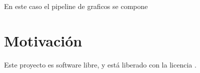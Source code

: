 En este caso el pipeline de graficos se compone 

\section{Motivación}

Este proyecto es software libre, y está liberado con la licencia \cite{gplv3}.

